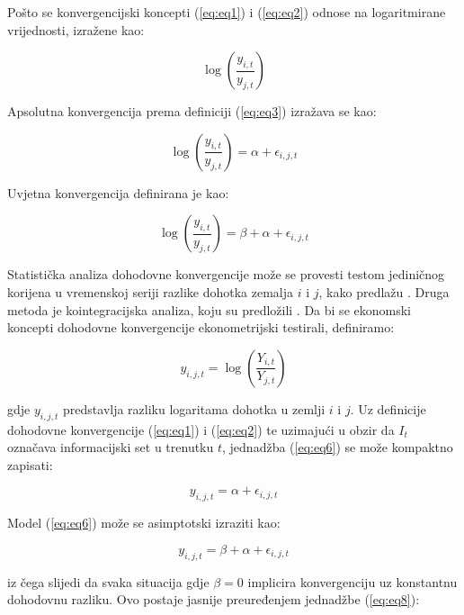 \documentclass{crebsshr}
\begin{document}
Pošto se konvergencijski koncepti (\ref{eq:eq1}) i (\ref{eq:eq2}) odnose na logaritmirane vrijednosti, izražene kao:

\begin{equation} \label{eq:eq3}
\log\left(\frac{y_{i,t}}{y_{j,t}}\right)
\end{equation}

Apsolutna konvergencija prema definiciji (\ref{eq:eq3}) izražava se kao:

\begin{equation} \label{eq:eq4}
\log\left(\frac{y_{i,t}}{y_{j,t}}\right) = \alpha + \epsilon_{i,j,t}
\end{equation}

Uvjetna konvergencija definirana je kao:

\begin{equation} \label{eq:eq5}
\log\left(\frac{y_{i,t}}{y_{j,t}}\right) = \beta + \alpha + \epsilon_{i,j,t}
\end{equation}

Statistička analiza dohodovne konvergencije može se provesti testom jediničnog korijena u vremenskoj seriji razlike dohotka zemalja \( i \) i \( j \), kako predlažu \cite{carlino-mills:93}. Druga metoda je kointegracijska analiza, koju su predložili \cite{bernard-durlauf:91}. Da bi se ekonomski koncepti dohodovne konvergencije ekonometrijski testirali, definiramo:

\begin{equation} \label{eq:eq6}
y_{i,j,t} = \log\left(\frac{Y_{i,t}}{Y_{j,t}}\right)
\end{equation}

gdje \( y_{i,j,t} \) predstavlja razliku logaritama dohotka u zemlji \( i \) i \( j \). Uz definicije dohodovne konvergencije (\ref{eq:eq1}) i (\ref{eq:eq2}) te uzimajući u obzir da \( I_t \) označava informacijski set u trenutku \( t \), jednadžba (\ref{eq:eq6}) se može kompaktno zapisati:

\begin{equation} \label{eq:eq7}
y_{i,j,t} = \alpha + \epsilon_{i,j,t}
\end{equation}

Model (\ref{eq:eq6}) može se asimptotski izraziti kao:

\begin{equation} \label{eq:eq8}
y_{i,j,t} = \beta + \alpha + \epsilon_{i,j,t}
\end{equation}

iz čega slijedi da svaka situacija gdje \( \beta = 0 \) implicira konvergenciju uz konstantnu dohodovnu razliku. Ovo postaje jasnije preuređenjem jednadžbe (\ref{eq:eq8}):
\end{document}
